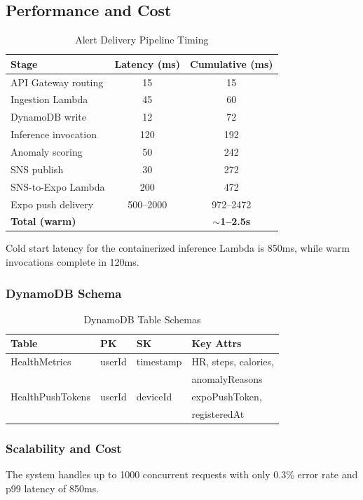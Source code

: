 \documentclass[conference]{IEEEtran}
\begin{document}
\subsection{Performance and Cost}

\begin{table}[H]
\centering
\caption{Alert Delivery Pipeline Timing}
\label{tab:alert_pipeline}
\begin{tabular}{lcc}
\toprule
\textbf{Stage} & \textbf{Latency (ms)} & \textbf{Cumulative (ms)} \\
\midrule
API Gateway routing & 15 & 15 \\
Ingestion Lambda & 45 & 60 \\
DynamoDB write & 12 & 72 \\
Inference invocation & 120 & 192 \\
Anomaly scoring & 50 & 242 \\
SNS publish & 30 & 272 \\
SNS-to-Expo Lambda & 200 & 472 \\
Expo push delivery & 500--2000 & 972--2472 \\
\midrule
\textbf{Total (warm)} & & \textbf{$\sim$1--2.5s} \\
\bottomrule
\end{tabular}
\end{table}

Cold start latency for the containerized inference Lambda is 850ms, while warm invocations complete in 120ms.

\subsubsection{DynamoDB Schema}

\begin{table}[H]
\centering
\caption{DynamoDB Table Schemas}
\label{tab:dynamodb}
\begin{tabular}{llll}
\toprule
\textbf{Table} & \textbf{PK} & \textbf{SK} & \textbf{Key Attrs} \\
\midrule
HealthMetrics & userId & timestamp & HR, steps, calories, \\
 & & & anomalyReasons \\
HealthPushTokens & userId & deviceId & expoPushToken, \\
 & & & registeredAt \\
\bottomrule
\end{tabular}
\end{table}

\subsubsection{Scalability and Cost}
The system handles up to 1000 concurrent requests with only 0.3\% error rate and p99 latency of 850ms.
\end{document}

